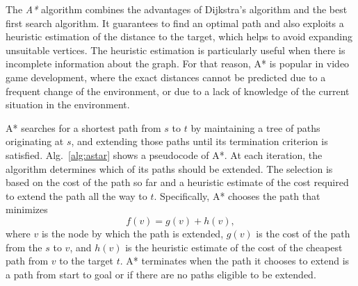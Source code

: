 The \emph{A*} algorithm \cite{hart68} combines the advantages of Dijkstra's algorithm and the best first search algorithm.
It guarantees to find an optimal path and also exploits a heuristic estimation of the distance to the target, which helps to avoid expanding unsuitable vertices.
The heuristic estimation is particularly useful when there is incomplete information about the graph.
For that reason, A* is popular in video game development, where the exact distances cannot be predicted due to a frequent change of the environment, 
or due to a lack of knowledge of the current situation in the environment.

A* searches for a shortest path from $s$ to $t$ by maintaining a tree of paths originating at $s$, and extending those paths until its termination criterion is satisfied.
Alg.~\ref{alg:astar} shows a pseudocode of A*.
At each iteration, the algorithm determines which of its paths should be extended. 
The selection is based on the cost of the path so far and a heuristic estimate of the cost required to extend the path all the way to $t$. 
Specifically, A* chooses the path that minimizes
$$
    f(v)=g(v)+h(v),
$$
where $v$ is the node by which the path is extended, $g(v)$ is the cost of the path from the $s$ to $v$, 
and $h(v)$ is the heuristic estimate of the cost of the cheapest path from $v$ to the target $t$. 
A* terminates when the path it chooses to extend is a path from start to goal or if there are no paths eligible to be extended.

